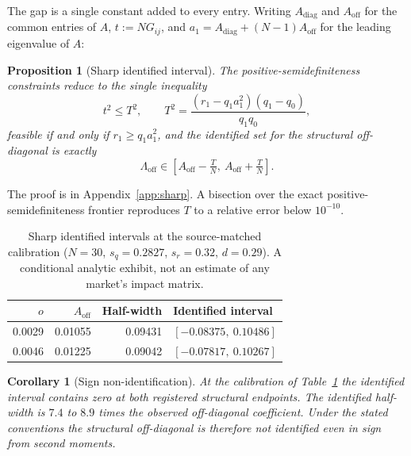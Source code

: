 \documentclass[10pt,twocolumn]{article}
\newtheorem{proposition}{Proposition}
\newtheorem{corollary}{Corollary}
\theoremstyle{remark}
\begin{document}
The gap is a single constant added to every entry. Writing $A_{\mathrm{diag}}$
and $A_{\mathrm{off}}$ for the common entries of $A$, $t:=NG_{ij}$, and
$a_1=A_{\mathrm{diag}}+(N-1)A_{\mathrm{off}}$ for the leading eigenvalue of
$A$:

\begin{proposition}[Sharp identified interval]
\label{prop:sharp}
The positive-semidefiniteness constraints reduce to the single inequality
\begin{equation}
t^2\le T^2,\qquad
T^2=\frac{(r_1-q_1a_1^2)(q_1-q_0)}{q_1q_0},
\label{eq:T}
\end{equation}
feasible if and only if $r_1\ge q_1a_1^2$, and the identified set for the
structural off-diagonal is exactly
\begin{equation}
\Lambda_{\mathrm{off}}\in
\left[A_{\mathrm{off}}-\tfrac{T}{N},\ A_{\mathrm{off}}+\tfrac{T}{N}\right].
\label{eq:sharp}
\end{equation}
\end{proposition}

The proof is in Appendix~\ref{app:sharp}. A bisection over the exact
positive-semidefiniteness frontier reproduces $T$ to a relative error below
$10^{-10}$.

\begin{table}[t]
\centering
\caption{Sharp identified intervals at the source-matched calibration
($N=30$, $s_q=0.2827$, $s_r=0.32$, $d=0.29$). A conditional analytic exhibit,
not an estimate of any market's impact matrix.}
\label{tab:sharp}
\small
\begin{tabular}{@{}rrrl@{}}
\toprule
$o$ & $A_{\mathrm{off}}$ & Half-width & Identified interval \\
\midrule
0.0029 & 0.01055 & 0.09431 & $[-0.08375,\ 0.10486]$ \\
0.0046 & 0.01225 & 0.09042 & $[-0.07817,\ 0.10267]$ \\
\bottomrule
\end{tabular}
\end{table}

\begin{corollary}[Sign non-identification]
\label{cor:sign}
At the calibration of Table~\ref{tab:sharp} the identified interval contains
zero at both registered structural endpoints. The identified half-width is
$7.4$ to $8.9$ times the observed off-diagonal coefficient. Under the stated
conventions the structural off-diagonal is therefore not identified even in
sign from second moments.
\end{corollary}
\end{document}
